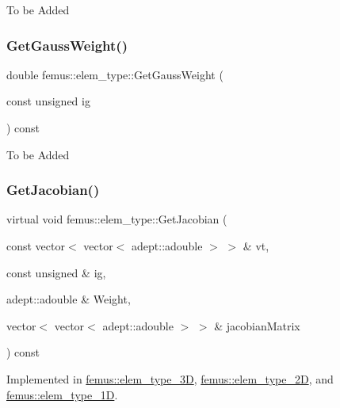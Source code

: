 To be Added \mbox{\label{classfemus_1_1elem__type_a86dfc5d292bb86bb02ac13f5acbb6c98}} 
\subsubsection{\texorpdfstring{Get\+Gauss\+Weight()}{GetGaussWeight()}}
{\footnotesize\ttfamily double femus\+::elem\+\_\+type\+::\+Get\+Gauss\+Weight (\begin{DoxyParamCaption}\item[{const unsigned}]{ig }\end{DoxyParamCaption}) const\hspace{0.3cm}{\ttfamily [inline]}}

To be Added \mbox{\label{classfemus_1_1elem__type_aa8e617c54dd774ffca5d305605552af7}} 
\subsubsection{\texorpdfstring{Get\+Jacobian()}{GetJacobian()}\hspace{0.1cm}{\footnotesize\ttfamily [1/2]}}
{\footnotesize\ttfamily virtual void femus\+::elem\+\_\+type\+::\+Get\+Jacobian (\begin{DoxyParamCaption}\item[{const vector$<$ vector$<$ adept\+::adouble $>$ $>$ \&}]{vt,  }\item[{const unsigned \&}]{ig,  }\item[{adept\+::adouble \&}]{Weight,  }\item[{vector$<$ vector$<$ adept\+::adouble $>$ $>$ \&}]{jacobian\+Matrix }\end{DoxyParamCaption}) const\hspace{0.3cm}{\ttfamily [pure virtual]}}



Implemented in \mbox{\hyperlink{classfemus_1_1elem__type__3_d_ada0cc038990bffab6a4bc3d1d23f057f}{femus\+::elem\+\_\+type\+\_\+3D}}, \mbox{\hyperlink{classfemus_1_1elem__type__2_d_a0cd4c80b3b6323d3ab4a57a29ad41034}{femus\+::elem\+\_\+type\+\_\+2D}}, and \mbox{\hyperlink{classfemus_1_1elem__type__1_d_af21e2d104c0f4ca0d18e5e51c8f5c91f}{femus\+::elem\+\_\+type\+\_\+1D}}.

